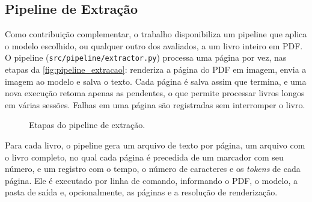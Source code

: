 \documentclass[noabntexcite,oneside]{ufsc-thesis-rn46-2019}
\begin{document}
\begin{apendicesenv}

\chapter{Pipeline de Extração}
\label{ap:pipeline}

Como contribuição complementar, o trabalho disponibiliza um pipeline que aplica o modelo
escolhido, ou qualquer outro dos avaliados, a um livro inteiro em PDF. O pipeline
(\texttt{src/pipeline/extractor.py}) processa uma página por vez, nas etapas da
\autoref{fig:pipeline_extracao}: renderiza a página do PDF em imagem, envia a imagem ao
modelo e salva o texto. Cada página é salva assim que termina, e uma nova execução retoma
apenas as pendentes, o que permite processar livros longos em várias sessões. Falhas em
uma página são registradas sem interromper o livro.

\begin{figure}[htb]
    \centering
    \caption{Etapas do pipeline de extração.}
    \label{fig:pipeline_extracao}
\end{figure}

Para cada livro, o pipeline gera um arquivo de texto por página, um arquivo com o livro
completo, no qual cada página é precedida de um marcador com seu número, e um registro com
o tempo, o número de caracteres e os \textit{tokens} de cada página. Ele é executado por
linha de comando, informando o PDF, o modelo, a pasta de saída e, opcionalmente, as páginas
e a resolução de renderização.


\end{apendicesenv}
\end{document}
